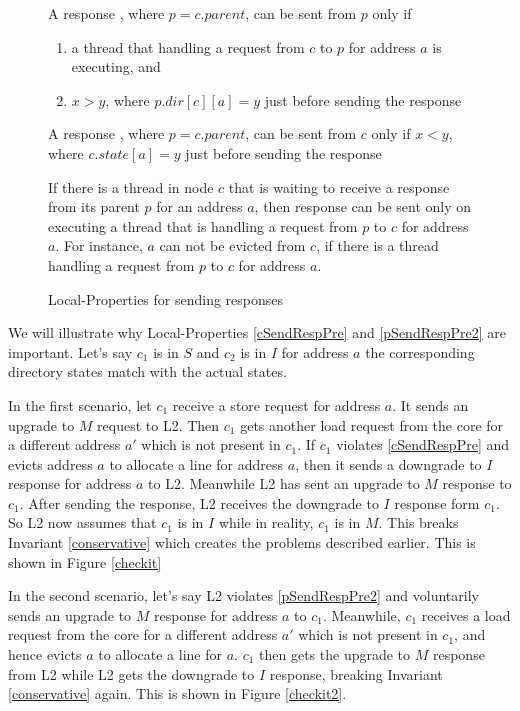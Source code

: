 \begin{figure}\small
\begin{inv}
A response , where $p = c.parent$, can be sent from $p$ only
if
\begin{enumerate}
\item a thread that handling a request from $c$ to $p$ for
address $a$ is executing, and
\item $x > y$, where $p.dir[c][a] = y$ just before sending the response
\end{enumerate}
\label{cSendRespPre}
\end{inv}
\begin{inv}
A response , where $p = c.parent$, can be sent from $c$ only
if $x < y$, where $c.state[a] = y$ just before sending the
response\label{pSendRespPre1}
\end{inv}
\begin{inv}
If there is a thread in node $c$ that is waiting to receive a response from its
parent $p$ for an address $a$, then response  can be sent only
on executing a thread that is handling a request from $p$ to $c$ for address
$a$. For instance, $a$ can not be evicted from $c$, if there is a thread
handling a request from $p$ to $c$ for address $a$.
\label{pSendRespPre2}
\end{inv}
\caption{Local-Properties for sending responses}
\label{sendResp}
\end{figure}

We will illustrate why Local-Properties \ref{cSendRespPre} and
\ref{pSendRespPre2} are important. Let's say $c_1$ is in $S$ and $c_2$ is in $I$
for address $a$ the corresponding directory states match with the actual states.

In the first scenario, let $c_1$ receive a store request for address $a$. It
sends an upgrade to $M$ request to L2. Then $c_1$ gets another load request from
the core for a different address $a'$ which is not present in $c_1$. If $c_1$
violates \ref{cSendRespPre} and evicts address $a$ to allocate a line for
address $a$, then it sends a downgrade to $I$ response for address $a$ to L2.
Meanwhile L2 has sent an upgrade to $M$ response to $c_1$. After sending the
response, L2 receives the downgrade to $I$ response form $c_1$. So L2 now
assumes that $c_1$ is in $I$ while in reality, $c_1$ is in $M$. This breaks
Invariant \ref{conservative} which creates the problems described earlier. This
is shown in Figure \ref{checkit}

In the second scenario, let's say L2 violates \ref{pSendRespPre2} and
voluntarily sends an upgrade to $M$ response for address $a$ to $c_1$.
Meanwhile, $c_1$ receives a load request from the core for a different address
$a'$ which is not present in $c_1$, and hence evicts $a$ to allocate a line for
$a$. $c_1$ then gets the upgrade to $M$ response from L2 while L2 gets the
downgrade to $I$ response, breaking Invariant \ref{conservative} again. This is
shown in Figure \ref{checkit2}.


